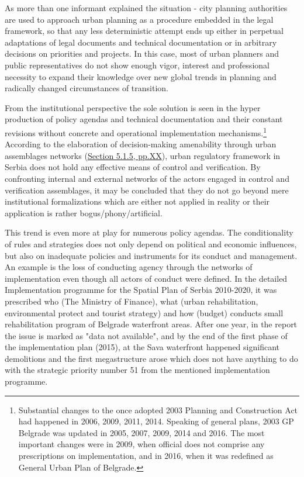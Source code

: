 \documentclass[11pt]{report}
\begin{document}
As more than one informant explained the situation - city planning authorities are used to approach urban planning as a procedure embedded in the legal framework, so that any less deterministic attempt ends up either in perpetual adaptations of legal documents and technical documentation or in arbitrary decisions on priorities and projects.
In this case, most of urban planners and public representatives do not show enough vigor, interest and professional necessity to expand their knowledge over new global trends in planning and radically changed circumstances of transition.

From the institutional perspective the sole solution is seen in the hyper production of policy agendas and technical documentation and their constant revisions without concrete and operational implementation mechanisms.\footnote{
Substantial changes to the once adopted 2003 Planning and Construction Act had happened in 2006, 2009, 2011, 2014.
Speaking of general plans, 2003 GP Belgrade was updated in 2005, 2007, 2009, 2014 and 2016.
The most important changes were in 2009, when official does not comprise any prescriptions on implementation, and in 2016, when it was redefined as General Urban Plan of Belgrade.}
According to the elaboration of decision-making amenability through urban assemblages networks (\href{ref}{Section 5.1.5, pp.XX}), urban regulatory framework in Serbia does not hold any effective means of control and verification.
By confronting internal and external networks of the actors engaged in control and verification assemblages, it may be concluded that they do not go beyond mere institutional formalizations which are either not applied in reality or their application is rather bogus/phony/artificial.

This trend is even more at play for numerous policy agendas.
The conditionality of rules and strategies does not only depend on political and economic influences, but also on inadequate policies and instruments for its conduct and management.
An example is the loss of conducting agency through the networks of implementation even though all actors of conduct were defined. In the detailed Implementation programme for the Spatial Plan of Serbia 2010-2020, it was prescribed who (The Ministry of Finance), what (urban rehabilitation, environmental protect and tourist strategy) and how (budget) conducts small rehabilitation program of Belgrade waterfront areas.
After one year, in the report the issue is marked as "data not available", and by the end of the first phase of the implementation plan (2015), at the Sava waterfront happened significant demolitions and the first megastructure arose which does not have anything to do with the strategic priority number 51 from the mentioned implementation programme.
\end{document}
